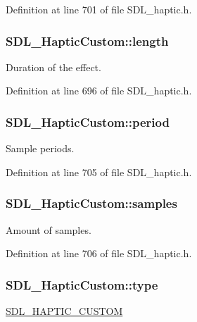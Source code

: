 Definition at line 701 of file S\-D\-L\-\_\-haptic.\-h.

\hypertarget{struct_s_d_l___haptic_custom_ad70e8bc2cff74b99d704a757c16b363f}{
\subsubsection[{length}]{ S\-D\-L\-\_\-\-Haptic\-Custom\-::length}}\label{struct_s_d_l___haptic_custom_ad70e8bc2cff74b99d704a757c16b363f}
Duration of the effect. 

Definition at line 696 of file S\-D\-L\-\_\-haptic.\-h.

\hypertarget{struct_s_d_l___haptic_custom_aba7fafa808e90baddef25f009b8f4817}{
\subsubsection[{period}]{ S\-D\-L\-\_\-\-Haptic\-Custom\-::period}}\label{struct_s_d_l___haptic_custom_aba7fafa808e90baddef25f009b8f4817}
Sample periods. 

Definition at line 705 of file S\-D\-L\-\_\-haptic.\-h.

\hypertarget{struct_s_d_l___haptic_custom_a5905ea1b6182da846535ca8c80b4fa33}{
\subsubsection[{samples}]{ S\-D\-L\-\_\-\-Haptic\-Custom\-::samples}}\label{struct_s_d_l___haptic_custom_a5905ea1b6182da846535ca8c80b4fa33}
Amount of samples. 

Definition at line 706 of file S\-D\-L\-\_\-haptic.\-h.

\hypertarget{struct_s_d_l___haptic_custom_a98a8995c94492069dc007502ed97eed2}{
\subsubsection[{type}]{ S\-D\-L\-\_\-\-Haptic\-Custom\-::type}}\label{struct_s_d_l___haptic_custom_a98a8995c94492069dc007502ed97eed2}
\hyperlink{_s_d_l__haptic_8h_a8a18c4de1076ac9bebd718329d16db29}{S\-D\-L\-\_\-\-H\-A\-P\-T\-I\-C\-\_\-\-C\-U\-S\-T\-O\-M} 

